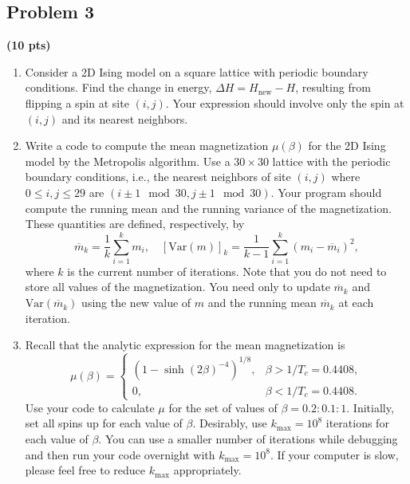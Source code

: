 \documentclass[12pt]{report}
\newenvironment{problem}{}{\newpage}
\begin{document}


\begin{problem}%
\subsection*{Problem 3}

\textbf{(10 pts)}
\begin{enumerate}
    \item Consider a 2D Ising model on a square lattice with periodic boundary conditions. Find the change in energy, \(\Delta H = H_{\text{new}} - H\), resulting from flipping a spin at site \((i,j)\). Your expression should involve only the spin at \((i,j)\) and its nearest neighbors.
    \item Write a code to compute the mean magnetization \(\mu(\beta)\) for the 2D Ising model by the Metropolis algorithm. Use a \(30 \times 30\) lattice with the periodic boundary conditions, i.e., the nearest neighbors of site \((i,j)\) where \(0 \leq i,j \leq 29\) are \((i \pm 1 \mod 30, j \pm 1 \mod 30)\). Your program should compute the running mean and the running variance of the magnetization. These quantities are defined, respectively, by
    \[
    \overline{m}_k = \frac{1}{k} \sum_{i=1}^{k} m_i, \quad [\text{Var}(m)]_k = \frac{1}{k - 1} \sum_{i=1}^{k} (m_i - \overline{m}_i)^2,
    \]
    where \(k\) is the current number of iterations. Note that you do not need to store all values of the magnetization. You need only to update \(\overline{m}_k\) and \(\text{Var}(\overline{m}_k)\) using the new value of \(m\) and the running mean \(\overline{m}_k\) at each iteration.
    \item Recall that the analytic expression for the mean magnetization is
    \begin{equation}
        \mu(\beta) = 
        \begin{cases}
        \left(1 - \sinh(2\beta)^{-4}\right)^{1/8}, & \beta > 1/T_c = 0.4408, \\
        0, & \beta < 1/T_c = 0.4408.
        \end{cases}     
    \end{equation}
    Use your code to calculate \(\mu\) for the set of values of \(\beta = 0.2:0.1:1\). Initially, set all spins up for each value of \(\beta\). Desirably, use \(k_{\text{max}} = 10^8\) iterations for each value of \(\beta\). You can use a smaller number of iterations while debugging and then run your code overnight with \(k_{\text{max}} = 10^8\). If your computer is slow, please feel free to reduce \(k_{\text{max}}\) appropriately.


\end{enumerate}
\end{problem}
\end{document}
